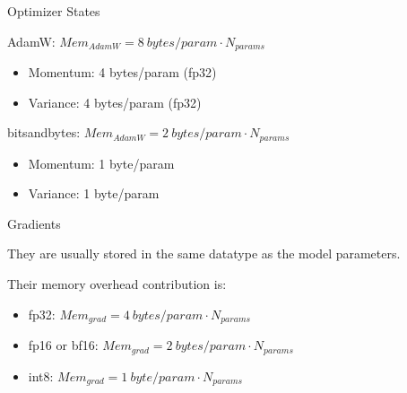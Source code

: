 \begin{vbframe}{Optimizer States}


\vfill

AdamW: $Mem_{AdamW} = 8 ~bytes/param \cdot N_{params}$
\begin{itemize}
 	\item Momentum: 4 bytes/param (fp32)
	\item Variance: 4 bytes/param (fp32)
\end{itemize}

\vskip3mm

bitsandbytes: $Mem_{AdamW} = 2 ~bytes/param \cdot N_{params}$
\begin{itemize}
 	\item Momentum: 1 byte/param
	\item Variance: 1 byte/param
\end{itemize}

%

\vfill

\end{vbframe}


\begin{vbframe}{Gradients}

\vfill

They are usually stored in the same datatype as the model parameters. \newline

Their memory overhead contribution is: \newline


\begin{itemize}
 	\item fp32: $Mem_{grad} = 4 ~bytes/param \cdot N_{params}$
 	\item fp16 or bf16: $Mem_{grad} = 2 ~bytes/param \cdot N_{params}$
	\item int8: $Mem_{grad} = 1 ~byte/param \cdot N_{params}$
\end{itemize}

\vfill

\end{vbframe}

